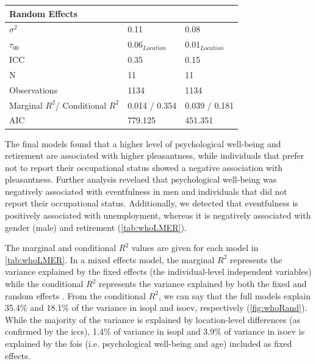 {\begin{landscape}
\begin{table}[ht]
\begin{tabular}{@{}lcccccc@{}}
  \midrule
  \multicolumn{7}{l}{\textbf{Random Effects}} \\ 
  \midrule
  $\sigma^2$         & \multicolumn{3}{l|}{0.11}               & \multicolumn{3}{l}{0.08}              \\
  $\tau_{00}$        & \multicolumn{3}{l|}{0.06$_{Location}$}  & \multicolumn{3}{l}{0.01$_{Location}$} \\
  ICC                & \multicolumn{3}{l|}{0.35}               & \multicolumn{3}{l}{0.15}              \\
  N                  & \multicolumn{3}{l|}{11}                 & \multicolumn{3}{l}{11}                \\
  \midrule
  Observations       & \multicolumn{3}{l|}{1134}               & \multicolumn{3}{l}{1134}          \\
  Marginal $R^2$/%
  Conditional $R^2$  & \multicolumn{3}{l|}{0.014 / 0.354}      & \multicolumn{3}{l}{0.039 / 0.181} \\
  AIC                & \multicolumn{3}{l|}{779.125}            & \multicolumn{3}{l}{451.351}       \\
  \bottomrule
  \end{tabular}
  \end{table}
  \end{landscape}
}

  The final models found that a higher level of psychological well-being and retirement are associated with higher pleasantness, while individuals that prefer not to report their occupational status showed a negative association with pleasantness. Further analysis revelaed that psychological well-being was negatively associated with eventfulness in men and individuals that did not report their occupational status. Additionally, we detected that eventfulness is positively associated with unemployment, whereas it is negatively associated with gender (male) and retirement (\cref{tab:whoLMER}). 

  The marginal and conditional $R^2$ values are given for each model in \cref{tab:whoLMER}. In a mixed effects model, the marginal $R^2$ represents the variance explained by the fixed effects (the individual-level independent variables) while the conditional $R^2$ represents the variance explained by both the fixed and random effects \citep{Nakagawa2012general}. From the conditional $R^2$, we can say that the full models explain 35.4\% and 18.1\% of the variance in \gls{isopl} and \gls{isoev}, respectively (\cref{fig:whoRand}). While the majority of the variance is explained by location-level differences (as confirmed by the \glspl{icc}), 1.4\% of variance in \gls{isopl} and 3.9\% of variance in \gls{isoev} is explained by the \glspl{foi} (i.e. psychological well-being and age) included as fixed effects.

